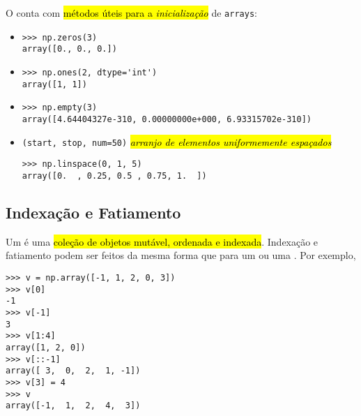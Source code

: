 O {\numpy} conta com \hl{métodos úteis para a \emph{inicialização}} de \texttt{arrays}:
\begin{itemize}
\item {\PYTHONnumpyDOTzeros} 

\begin{lstlisting}[xrightmargin=2.5em]
>>> np.zeros(3)
array([0., 0., 0.])
\end{lstlisting}

\item {\PYTHONnumpyDOTones} 

\begin{lstlisting}[xrightmargin=2.5em]
>>> np.ones(2, dtype='int')
array([1, 1])
\end{lstlisting}

\item {\PYTHONnumpyDOTempty} 

\begin{lstlisting}[xrightmargin=2.5em]
>>> np.empty(3)
array([4.64404327e-310, 0.00000000e+000, 6.93315702e-310])
\end{lstlisting}

\item {\PYTHONnumpyDOTlinspace}\texttt{(start, stop, num=50)} \emph{\hl{arranjo de elementos uniformemente espaçados}}

\begin{lstlisting}[xrightmargin=2.5em]
>>> np.linspace(0, 1, 5)
array([0.  , 0.25, 0.5 , 0.75, 1.  ])
\end{lstlisting}
\end{itemize}

\subsection{Indexação e Fatiamento}\label{cap_arr_sec_arr:ssec:islice}

Um {\PYTHONnumpyDOTarray} é uma \hl{coleção de objetos mutável, ordenada e indexada}. Indexação e fatiamento podem ser feitos da mesma forma que para um {\PYTHONtuple} ou uma {\PYTHONlist}. Por exemplo,

\begin{lstlisting}
>>> v = np.array([-1, 1, 2, 0, 3])
>>> v[0]
-1
>>> v[-1]
3
>>> v[1:4]
array([1, 2, 0])
>>> v[::-1]
array([ 3,  0,  2,  1, -1])
>>> v[3] = 4
>>> v
array([-1,  1,  2,  4,  3])
\end{lstlisting}


